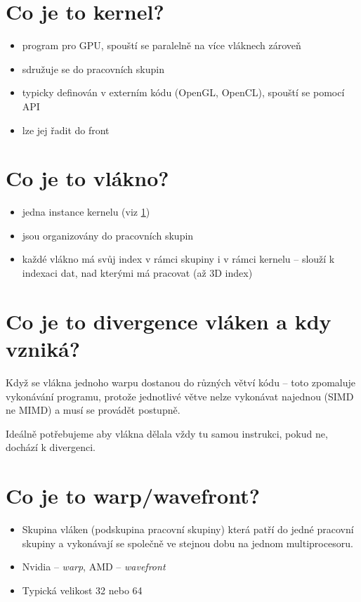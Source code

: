 \section{Co je to kernel?}
	\label{sec:kernel}
	\begin{itemize}
		\setlength\itemsep{0em}
		\item program pro GPU, spouští se paralelně na více vláknech zároveň
		\item sdružuje se do pracovních skupin
		\item typicky definován v externím kódu (OpenGL, OpenCL), spouští se pomocí API
		\item lze jej řadit do front
	\end{itemize}


\section{Co je to vlákno?}
	\begin{itemize}
		\setlength\itemsep{0em}
		\item jedna instance kernelu (viz \ref{sec:kernel})
		\item jsou organizovány do pracovních skupin
		\item každé vlákno má svůj index v rámci skupiny i v rámci kernelu -- slouží k indexaci dat, nad kterými má pracovat (až 3D index)
	\end{itemize}
	

\section{Co je to divergence vláken a kdy vzniká?}
	Když se vlákna jednoho warpu dostanou do různých větví kódu -- toto zpomaluje vykonávání programu, protože jednotlivé větve nelze vykonávat najednou (SIMD ne MIMD)
	a musí se provádět postupně.
	
	Ideálně potřebujeme aby vlákna dělala vždy tu samou instrukci, pokud ne, dochází k divergenci.
	

\section{Co je to warp/wavefront?}
	\begin{itemize}
		\setlength\itemsep{0em}
		\item Skupina vláken (podskupina pracovní skupiny) která patří do jedné pracovní skupiny a vykonávají se společně ve stejnou dobu na jednom multiprocesoru.
		\item Nvidia -- \emph{warp}, AMD -- \emph{wavefront}
		\item Typická velikost 32 nebo 64
	\end{itemize}
	

